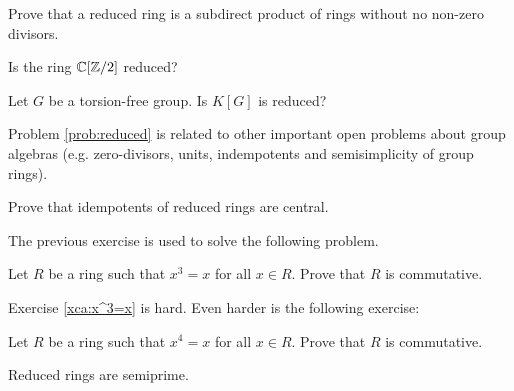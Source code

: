 \begin{exercise}
    Prove that a reduced ring is a subdirect product
    of rings without no non-zero divisors. 
\end{exercise}


\begin{exercise}
    Is the ring $\mathbb{C}[\mathbb{Z}/2]$ reduced? 
\end{exercise}


\begin{problem}
\label{prob:reduced}
    Let $G$ be a torsion-free group. Is
    $K[G]$ is reduced?
\end{problem}

Problem \ref{prob:reduced} is related to other important
open problems about group algebras 
(e.g. zero-divisors, units, 
indempotents and semisimplicity of group
rings).

\begin{exercise}
\label{xca:reduced_central}
    Prove that idempotents of reduced rings are central. 
\end{exercise}

The previous exercise is used to solve the following problem.

\begin{exercise}
\label{xca:x^3=x}
    Let $R$ be a ring such that $x^3=x$ for all $x\in R$. Prove that
    $R$ is commutative. 
\end{exercise}

Exercise \ref{xca:x^3=x} is hard. 
Even harder is the following exercise:

\begin{exercise}
\label{xca:x^4=x}
    Let $R$ be a ring such that $x^4=x$ for all $x\in R$. Prove
    that $R$ is commutative. 
\end{exercise}



\begin{exercise}
\label{xca:reduced=>semiprime}
    Reduced rings are semiprime.
\end{exercise}
 
